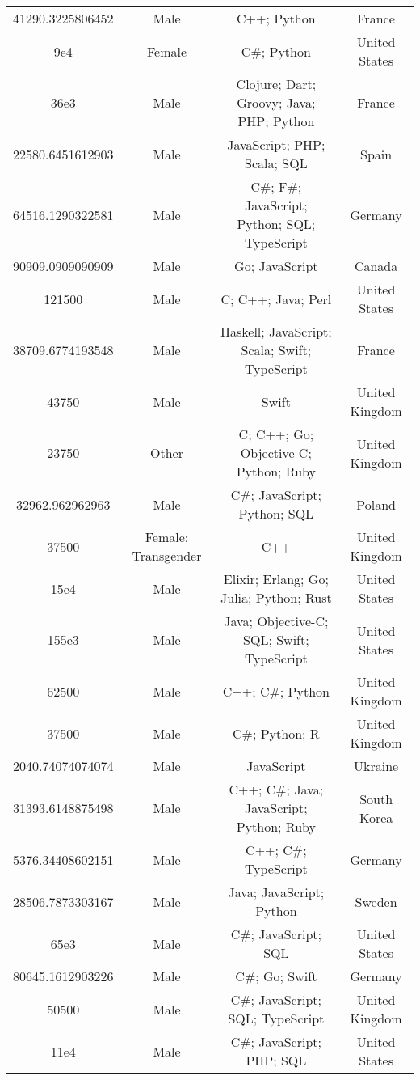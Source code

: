 \begin{center}
\begin{tabular}{ |c|c|c|c| }
41290.3225806452  &  Male  &  C++; Python  &  France  \\ 
9e4  &  Female  &  C\#; Python  &  United States  \\ 
36e3  &  Male  &  Clojure; Dart; Groovy; Java; PHP; Python  &  France  \\ 
22580.6451612903  &  Male  &  JavaScript; PHP; Scala; SQL  &  Spain  \\ 
64516.1290322581  &  Male  &  C\#; F\#; JavaScript; Python; SQL; TypeScript  &  Germany  \\ 
90909.0909090909  &  Male  &  Go; JavaScript  &  Canada  \\ 
121500  &  Male  &  C; C++; Java; Perl  &  United States  \\ 
38709.6774193548  &  Male  &  Haskell; JavaScript; Scala; Swift; TypeScript  &  France  \\ 
43750  &  Male  &  Swift  &  United Kingdom  \\ 
23750  &  Other  &  C; C++; Go; Objective-C; Python; Ruby  &  United Kingdom  \\ 
32962.962962963  &  Male  &  C\#; JavaScript; Python; SQL  &  Poland  \\ 
37500  &  Female; Transgender  &  C++  &  United Kingdom  \\ 
15e4  &  Male  &  Elixir; Erlang; Go; Julia; Python; Rust  &  United States  \\ 
155e3  &  Male  &  Java; Objective-C; SQL; Swift; TypeScript  &  United States  \\ 
62500  &  Male  &  C++; C\#; Python  &  United Kingdom  \\ 
37500  &  Male  &  C\#; Python; R  &  United Kingdom  \\ 
2040.74074074074  &  Male  &  JavaScript  &  Ukraine  \\ 
31393.6148875498  &  Male  &  C++; C\#; Java; JavaScript; Python; Ruby  &  South Korea  \\ 
5376.34408602151  &  Male  &  C++; C\#; TypeScript  &  Germany  \\ 
28506.7873303167  &  Male  &  Java; JavaScript; Python  &  Sweden  \\ 
65e3  &  Male  &  C\#; JavaScript; SQL  &  United States  \\ 
80645.1612903226  &  Male  &  C\#; Go; Swift  &  Germany  \\ 
50500  &  Male  &  C\#; JavaScript; SQL; TypeScript  &  United Kingdom  \\ 
11e4  &  Male  &  C\#; JavaScript; PHP; SQL  &  United States  \\ 

\end{tabular}
\end{center}
